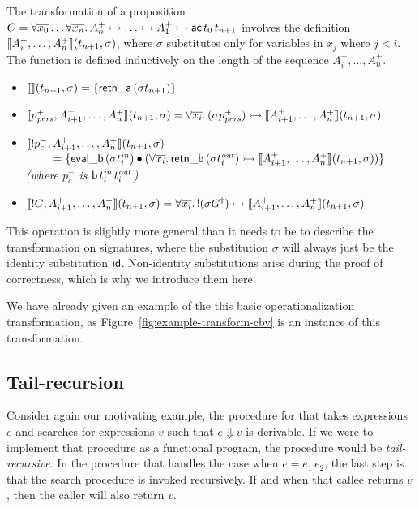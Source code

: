 The transformation of a proposition $C = \forall
\overline{x_0}\ldots \forall \overline{x_n}.\,A^+_n \rightarrowtail \ldots
\rightarrowtail A^+_1 \rightarrowtail {\sf ac}\,t_{0}\,t_{n+1}$ involves the definition
$\llbracket {A^+_i,\ldots,A^+_n} \rrbracket({t_{n+1}},{\sigma})$, where $\sigma$
substitutes only for variables in $\overline{x_j}$ where $j < i$. The
function is defined inductively on the length of the sequence
$A^+_i,\ldots,A^+_n$.

\begin{itemize}
\item $\llbracket {} \rrbracket({t_{n+1}},{\sigma}) = \{ {\sf retn\_a}\,(\sigma{t_{n+1}}) \}$
\item $\llbracket {p^+_{\it pers},A^+_{i+1},\ldots,A^+_n} \rrbracket({t_{n+1}},{\sigma}) 
  = \forall \overline{x_i}.\, (\sigma{p^+_{\it pers}}) \rightarrowtail \llbracket {A^+_{i+1},\ldots,A^+_n} \rrbracket({t_{n+1}},{\sigma})$
\item $\llbracket {{!}p^-_c,A^+_{i+1},\ldots,A^+_n} \rrbracket({t_{n+1}},{\sigma})$
  \\
  $~ \qquad = \{ {\sf eval\_b}\,({\sigma}t^{\it in}_i) \mathbin{\bullet}
  (\forall\overline{x_i}.\, {\sf retn\_b}\,(\sigma{t^{\it out}_i})
  \rightarrowtail \llbracket {A^+_{i+1},\ldots,A^+_n} \rrbracket({t_{n+1}},{\sigma})) \}$\\
  {\it (where $p^-_c$ is ${\sf b}\,t^{\it in}_i\,t^{\it out}_i$)}
\item $\llbracket {{!}G,A^+_{i+1},\ldots,A^+_n} \rrbracket({t_{n+1}},{\sigma}) = \forall
  \overline{x_i}.\, {!}(\sigma{{G}^\dag}) \rightarrowtail
  \llbracket {A^+_{i+1},\ldots,A^+_n} \rrbracket({t_{n+1}},{\sigma})$
\end{itemize}

\noindent
This operation is slightly more general than it needs to be to
describe the transformation on signatures, where the substitution
$\sigma$ will always just be the identity substitution ${\sf id}$.
Non-identity substitutions arise during the proof of correctness, which
is why we introduce them here.

We have already given an example of the this basic operationalization
transformation, as Figure~\ref{fig:example-transform-cbv} is an
instance of this transformation.

\subsection{Tail-recursion}
\label{sec:trans-tail}

Consider again our motivating example, the procedure for that takes
expressions $e$ and searches for expressions $v$ such that $e
\Downarrow v$ is derivable. If we were to implement that procedure as
a functional program, the procedure would be {\it tail-recursive}. In
the procedure that handles the case when $e = e_1\,e_2$, the last step
is that the search procedure is invoked recursively. If and when that
callee returns $v$, then the caller will also return $v$.

